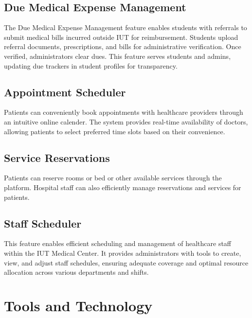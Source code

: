 \documentclass[11.5pt]{article}
\begin{document}
	\subsection{Due Medical Expense Management}

	The Due Medical Expense Management feature enables students with referrals to submit medical bills incurred outside IUT for reimbursement. Students upload referral documents, prescriptions, and bills for administrative verification. Once verified, administrators clear dues. This feature serves students and admins, updating due trackers in student profiles for transparency.
	
	
	\subsection{Appointment Scheduler}
	
	Patients can conveniently book appointments with healthcare providers through an intuitive online calender. The system provides real-time availability of doctors, allowing patients to select preferred time slots based on their convenience.
	
	
	\subsection{Service Reservations}
	
	Patients can reserve rooms or bed or other available services through the platform. Hospital staff can also efficiently manage reservations and services for patients.
	
	
	\subsection{Staff Scheduler}
	This feature enables efficient scheduling and management of healthcare staff within the IUT Medical Center. It provides administrators with tools to create, view, and adjust staff schedules, ensuring adequate coverage and optimal resource allocation across various departments and shifts.
	
	
	
	
	\section{Tools and Technology}
	
\end{document}
